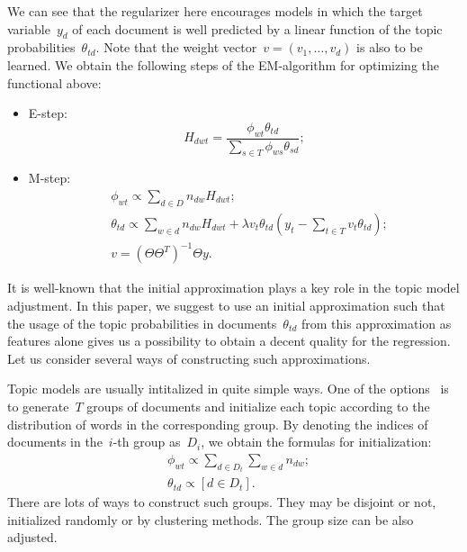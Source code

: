 \documentclass{sig-alternate-2013}
\begin{document}
We can see that the regularizer here encourages models in which the target variable~$y_d$ of each document
is well predicted by a linear function of the topic probabilities~$\theta_{td}$.
Note that the weight vector~$v = (v_1, \dots, v_d)$ is also to be learned.
We obtain the following steps of the EM-algorithm for optimizing the functional above:
\begin{itemize}
    \item E-step:
        \[
            H_{dwt}
            =
            \frac{
                \phi_{wt} \theta_{td}
            }{
                \sum_{s \in T} \phi_{ws} \theta_{sd}
            };
        \]
    \item M-step:
        \begin{align*}
            &\phi_{wt}
            \propto
            \sum_{d \in D}
                n_{dw} H_{dwt};\\
            &\theta_{td}
            \propto
            \sum_{w \in d}
                n_{dw} H_{dwt}
            +
            \lambda v_t \theta_{td}
            \left(
                y_t
                -
                \sum_{t \in T}
                    v_t \theta_{td}
            \right);\\
            &
            v
            =
            (\Theta \Theta^T)^{-1} \Theta y.
            \end{align*}
\end{itemize}


It is well-known that the initial approximation plays a key role in the topic model adjustment.
In this paper, we suggest to use an initial approximation such that
the usage of the topic probabilities in documents~$\theta_{td}$ from this approximation
as features alone gives us a possibility to obtain a decent quality for the regression.
Let us consider several ways of constructing such approximations.


Topic models are usually intitalized in quite simple ways.
One of the options~\cite{blei03lda} is to generate~$T$ groups of documents
and initialize each topic according to the distribution of words in the corresponding group.
By denoting the indices of documents in the~$i$-th group as~$D_i$, we obtain the formulas for initialization:
\begin{align*}
    &\phi_{wt}
    \propto
    \sum_{d \in D_t}
    \sum_{w \in d}
        n_{dw};\\
    &\theta_{td}
    \propto
    [d \in D_t].
\end{align*}
There are lots of ways to construct such groups.
They may be disjoint or not, initialized randomly or by clustering methods.
The group size can be also adjusted.
\end{document}
